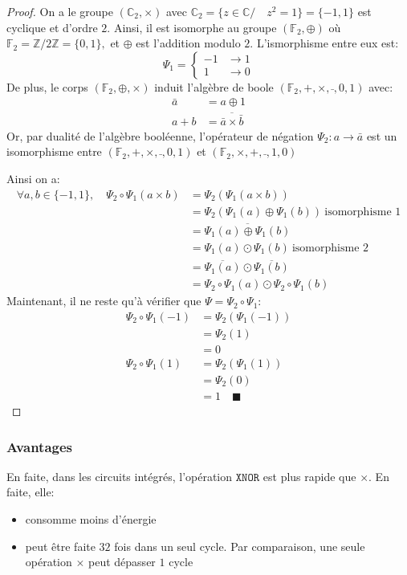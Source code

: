 \begin{proof}
	On a le groupe $(\mathbb{C}_2,\times )$  avec $\mathbb{C}_2=\{z\in \mathbb{C} / \quad z^2=1\}=\{-1,1\}$ est cyclique et d'ordre $2.$ Ainsi, il est isomorphe au groupe $(\mathbb{F}_2,\oplus)$ où $\mathbb{F}_2=\mathbb{Z}/2\mathbb{Z}=\{0,1\},$ et $\oplus$ est l'addition modulo $2$. 
	\newline L'ismorphisme entre eux est: 
	$$\Psi_1=\begin{cases}
		-1 & \rightarrow 1 \\
		1 & \rightarrow 0
	\end{cases}$$
	De plus, le corps $(\mathbb{F}_2,\oplus,\times)$ induit l'algèbre de boole $(\mathbb{F}_2,+,\times,\bar{},0,1)$ avec:
	\begin{align*}
		\bar{a}&=a\oplus 1 \\
		a+ b &= \overbar{\bar{a}\times\bar{b}}
	\end{align*}
	Or, par dualité de l'algèbre booléenne, l'opérateur de négation $\Psi_2:a\rightarrow \bar{a}$ est un isomorphisme entre $(\mathbb{F}_2,+,\times,\bar{},0,1)$ et $(\mathbb{F}_2,\times,+,\bar{},1,0)$
	
	Ainsi on a:
	\begin{align*}
	\forall a,b\in\{-1,1\}, \quad \Psi_2\circ \Psi_1( a\times b)  &= \Psi_2(\Psi_1(a\times b)) \\
			&=\Psi_2(\Psi_1(a)\oplus \Psi_1(b)) \ \text{isomorphisme 1} \\ 
			&=\overbar{\Psi_1(a)\oplus \Psi_1(b)}  \\
			&=\Psi_1 (a) \odot \Psi_1(b) \ \text{isomorphisme 2} \\
			&= \overbar{\Psi_1 (a)} \odot \overbar{\Psi_1(b)} \\
			&= \Psi_2\circ \Psi_1 (a) \odot \Psi_2\circ \Psi_1(b)  
	\end{align*}
	Maintenant, il ne reste qu'à vérifier que $\Psi=\Psi_2\circ \Psi_1:$
	\begin{align*}
		\Psi_2\circ \Psi_1(-1) &=\Psi_2(\Psi_1(-1))\\
		&=\Psi_2(1) \\
		&=0 \\
		\Psi_2\circ \Psi_1(1) &=\Psi_2(\Psi_1(1))\\
		&=\Psi_2(0) \\
		&=1 \quad \blacksquare
	\end{align*}
\end{proof}
\subsubsection{Avantages}
En faite, dans les circuits intégrés, l'opération $\mathtt{XNOR}$ est plus rapide que $\times$. En faite, elle:
\begin{itemize}
	\item consomme moins d'énergie
	\item peut être faite $32$ fois dans un seul cycle. Par comparaison, une seule opération $\times$ peut dépasser $1$ cycle 
\end{itemize}
 \newpage
